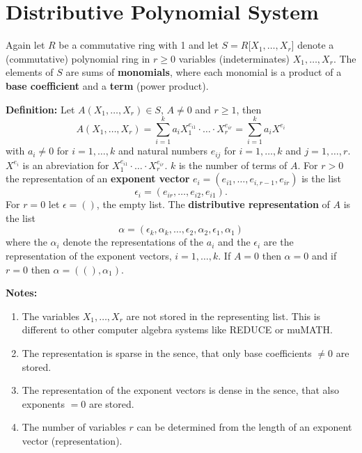 

\section{Distributive Polynomial System} %

Again let $R$ be a commutative ring with 1 and let 
$S = R \lbrack X_1, \ldots, X_r \rbrack$ denote a  
(commutative) polynomial ring in $r \geq 0$ variables  
(indeterminates) $X_1, \ldots, X_r$.
The elements of $S$ are sums of {\bf monomials}, 
where each monomial is a product of a {\bf base coefficient} 
and a {\bf term} (power product).

{\bf Definition:}
Let $A(X_1, \ldots, X_r) \in S$, $A \neq 0$ and $r \geq 1$,
then 
$$ A(X_1, \ldots, X_r) = 
  \sum_{i=1}^{k} a_i X_1^{e_{i1}} \cdot \ldots \cdot X_r^{e_{ir}}
  = \sum_{i=1}^{k} a_i X^{e_i}
$$ 
with $a_i \neq 0$ for $i=1,\ldots,k$ and 
natural numbers $e_{ij}$ for $i=1,\ldots,k$ and $j=1,\ldots,r$. 
$X^{e_i}$ is an abreviation for 
$X_1^{e_{i1}} \cdot \ldots \cdot X_r^{e_{ir}}$.
$k$ is the number of terms of $A$.
For $r > 0$ the representation of an {\bf exponent vector} 
$e_i = ( e_{i1}, \ldots, e_{i,r-1}, e_{ir} )$ is the list 
$$
  \epsilon_i = ( e_{ir}, \ldots, e_{i2}, e_{i1} ).
$$
For $r = 0$ let $\epsilon = ()$, the empty list. 
The {\bf distributive representation} of $A$ is the list
$$
  \alpha = ( \epsilon_k, \alpha_k, \ldots,  
       \epsilon_2, \alpha_2, \epsilon_1, \alpha_1 ) 
$$   
where the $\alpha_i$ denote the  
representations of the $a_i$ and 
the $\epsilon_i$ are the representation of the exponent vectors, 
$i=1,\ldots,k$.  
If $A = 0$ then $\alpha = 0$ and 
if $r = 0$ then $\alpha = ( (), \alpha_1 )$.

{\bf Notes:}
\begin{enumerate}
\item The variables $X_1, \ldots, X_r$ are not stored 
      in the representing list. This is different to 
      other computer algebra systems like REDUCE or muMATH.
\item The representation is sparse in the sence, that 
      only base coefficients $\neq 0$ are stored.
\item The representation of the exponent vectors is dense 
      in the sence, that also exponents $= 0$ are stored.
\item The number of variables $r$ can be determined from the 
      length of an exponent vector (representation).
\end{enumerate}

